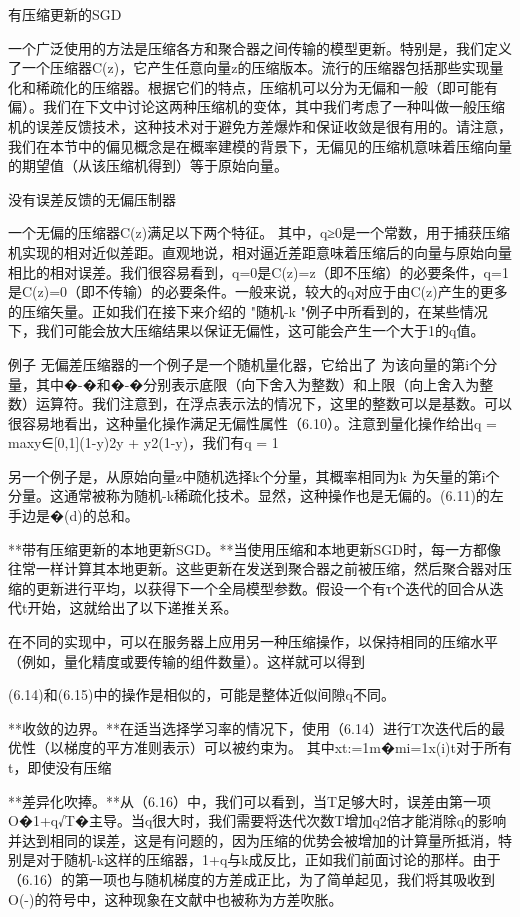 有压缩更新的SGD

一个广泛使用的方法是压缩各方和聚合器之间传输的模型更新。特别是，我们定义了一个压缩器C(z)，它产生任意向量z的压缩版本。流行的压缩器包括那些实现量化和稀疏化的压缩器。根据它们的特点，压缩机可以分为无偏和一般（即可能有偏）。我们在下文中讨论这两种压缩机的变体，其中我们考虑了一种叫做一般压缩机的误差反馈技术，这种技术对于避免方差爆炸和保证收敛是很有用的。请注意，我们在本节中的偏见概念是在概率建模的背景下，无偏见的压缩机意味着压缩向量的期望值（从该压缩机得到）等于原始向量。

没有误差反馈的无偏压制器

一个无偏的压缩器C(z)满足以下两个特征。
其中，q≥0是一个常数，用于捕获压缩机实现的相对近似差距。直观地说，相对逼近差距意味着压缩后的向量与原始向量相比的相对误差。我们很容易看到，q=0是C(z)=z（即不压缩）的必要条件，q=1是C(z)=0（即不传输）的必要条件。一般来说，较大的q对应于由C(z)产生的更多的压缩矢量。正如我们在接下来介绍的 "随机-k "例子中所看到的，在某些情况下，我们可能会放大压缩结果以保证无偏性，这可能会产生一个大于1的q值。

例子 无偏差压缩器的一个例子是一个随机量化器，它给出了
为该向量的第i个分量，其中�-�和�-�分别表示底限（向下舍入为整数）和上限（向上舍入为整数）运算符。我们注意到，在浮点表示法的情况下，这里的整数可以是基数。可以很容易地看出，这种量化操作满足无偏性属性（6.10）。注意到量化操作给出q = maxy∈[0,1](1-y)2y + y2(1-y)，我们有q = 1

另一个例子是，从原始向量z中随机选择k个分量，其概率相同为k
为矢量的第i个分量。这通常被称为随机-k稀疏化技术。显然，这种操作也是无偏的。(6.11)的左手边是�(d)的总和。

**带有压缩更新的本地更新SGD。**当使用压缩和本地更新SGD时，每一方都像往常一样计算其本地更新。这些更新在发送到聚合器之前被压缩，然后聚合器对压缩的更新进行平均，以获得下一个全局模型参数。假设一个有τ个迭代的回合从迭代t开始，这就给出了以下递推关系。

在不同的实现中，可以在服务器上应用另一种压缩操作，以保持相同的压缩水平（例如，量化精度或要传输的组件数量）。这样就可以得到

(6.14)和(6.15)中的操作是相似的，可能是整体近似间隙q不同。

**收敛的边界。**在适当选择学习率的情况下，使用（6.14）进行T次迭代后的最优性（以梯度的平方准则表示）可以被约束为。
其中xt:=1m�mi=1x(i)t对于所有t，即使没有压缩

**差异化吹捧。**从（6.16）中，我们可以看到，当T足够大时，误差由第一项O�1+q√T�主导。当q很大时，我们需要将迭代次数T增加q2倍才能消除q的影响并达到相同的误差，这是有问题的，因为压缩的优势会被增加的计算量所抵消，特别是对于随机-k这样的压缩器，1+q与k成反比，正如我们前面讨论的那样。由于（6.16）的第一项也与随机梯度的方差成正比，为了简单起见，我们将其吸收到O(-)的符号中，这种现象在文献中也被称为方差吹胀。

